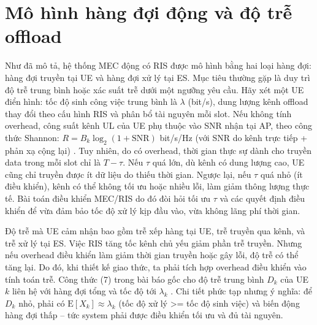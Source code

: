 \section{Mô hình hàng đợi động và độ trễ offload}

Như đã mô tả, hệ thống MEC động có RIS được mô hình bằng hai loại hàng đợi: hàng đợi truyền tại UE và hàng đợi xử lý tại ES. Mục tiêu thường gặp là duy trì độ trễ trung bình hoặc xác suất trễ dưới một ngưỡng yêu cầu. Hãy xét một UE điển hình: tốc độ sinh công việc trung bình là $\lambda$ (bit/s), dung lượng kênh offload thay đổi theo cấu hình RIS và phân bổ tài nguyên mỗi slot. Nếu không tính overhead, công suất kênh UL của UE phụ thuộc vào SNR nhận tại AP, theo công thức Shannon: $R = B_k \log_2(1 + \text{SNR})$ bit/s/Hz (với SNR do kênh trực tiếp + phản xạ cộng lại)
\cite{ris_latency}
. Tuy nhiên, do có overhead, thời gian thực sự dành cho truyền data trong mỗi slot chỉ là $T-\tau$. Nếu $\tau$ quá lớn, dù kênh có dung lượng cao, UE cũng chỉ truyền được ít dữ liệu do thiếu thời gian. Ngược lại, nếu $\tau$ quá nhỏ (ít điều khiển), kênh có thể không tối ưu hoặc nhiều lỗi, làm giảm thông lượng thực tế. Bài toán điều khiển MEC/RIS do đó đòi hỏi tối ưu $\tau$ và các quyết định điều khiển để vừa đảm bảo tốc độ xử lý kịp đầu vào, vừa không lãng phí thời gian. 



Độ trễ mà UE cảm nhận bao gồm trễ xếp hàng tại UE, trễ truyền qua kênh, và trễ xử lý tại ES. Việc RIS tăng tốc kênh chủ yếu giảm phần trễ truyền. Nhưng nếu overhead điều khiển làm giảm thời gian truyền hoặc gây lỗi, độ trễ có thể tăng lại. Do đó, khi thiết kế giao thức, ta phải tích hợp overhead điều khiển vào tính toán trễ. Công thức (7) trong bài báo gốc cho độ trễ trung bình $D_k$ của UE $k$ liên hệ với hàng đợi tổng và tốc độ tới $\lambda_k$
\cite{ris_latency}
. Chi tiết phức tạp nhưng ý nghĩa: để $D_k$ nhỏ, phải có $\text{E}[X_k] \approx \lambda_k$ (tốc độ xử lý >= tốc độ sinh việc) và biến động hàng đợi thấp – tức system phải được điều khiển tối ưu và đủ tài nguyên.